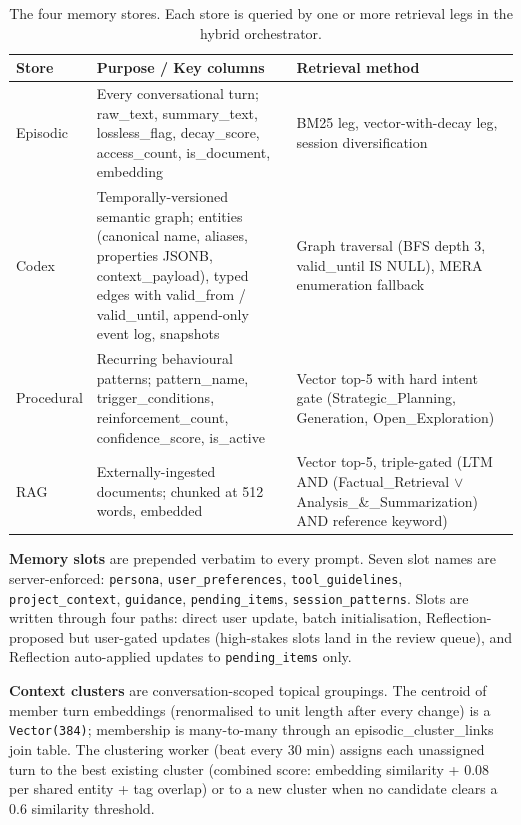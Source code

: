 \documentclass[10pt]{article}
\begin{document}
\begin{table}[htbp]
\centering
\small
\caption{The four memory stores. Each store is queried by one or more retrieval legs in the hybrid orchestrator.}
\label{tab:stores}
\begin{tabular}{p{}p{}p{}}
\toprule
\textbf{Store} & \textbf{Purpose / Key columns} & \textbf{Retrieval method} \\
\midrule
Episodic & Every conversational turn; raw\_text, summary\_text, lossless\_flag, decay\_score, access\_count, is\_document, embedding & BM25 leg, vector-with-decay leg, session diversification \\
Codex & Temporally-versioned semantic graph; entities (canonical name, aliases, properties JSONB, context\_payload), typed edges with valid\_from / valid\_until, append-only event log, snapshots & Graph traversal (BFS depth 3, valid\_until IS NULL), MERA enumeration fallback \\
Procedural & Recurring behavioural patterns; pattern\_name, trigger\_conditions, reinforcement\_count, confidence\_score, is\_active & Vector top-5 with hard intent gate (Strategic\_Planning, Generation, Open\_Exploration) \\
RAG & Externally-ingested documents; chunked at 512 words, embedded & Vector top-5, triple-gated (LTM AND (Factual\_Retrieval $\lor$ Analysis\_\&\_Summarization) AND reference keyword) \\
\bottomrule
\end{tabular}
\end{table}

\textbf{Memory slots} are prepended verbatim to every prompt. Seven slot names are server-enforced: \texttt{persona}, \texttt{user\_preferences}, \texttt{tool\_guidelines}, \texttt{project\_context}, \texttt{guidance}, \texttt{pending\_items}, \texttt{session\_patterns}. Slots are written through four paths: direct user update, batch initialisation, Reflection-proposed but user-gated updates (high-stakes slots land in the review queue), and Reflection auto-applied updates to \texttt{pending\_items} only.

\textbf{Context clusters} are conversation-scoped topical groupings. The centroid of member turn embeddings (renormalised to unit length after every change) is a \texttt{Vector(384)}; membership is many-to-many through an episodic\_cluster\_links join table. The clustering worker (beat every 30 min) assigns each unassigned turn to the best existing cluster (combined score: embedding similarity + 0.08 per shared entity + tag overlap) or to a new cluster when no candidate clears a 0.6 similarity threshold.
\end{document}
